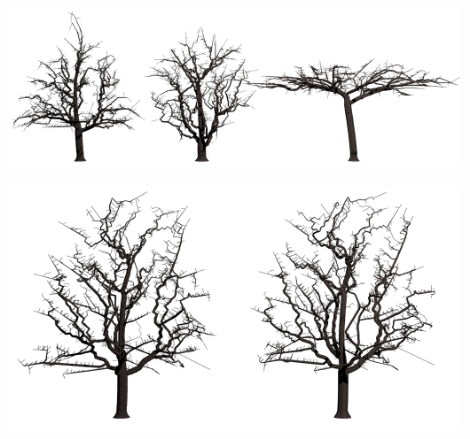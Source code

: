\begin{center}
	\includegraphics[width=120mm]{images/renders/shape.png}
\end{center}

\begin{center}
	\includegraphics[width=120mm]{images/renders/smooth.png}
\end{center}
